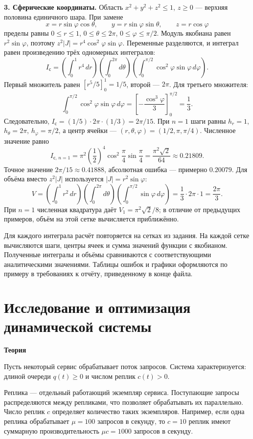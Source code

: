 \documentclass[12pt,a4paper]{article}
\newcommand{\taskhead}[1]{\par\textbf{#1}\par}
\begin{document}
\textbf{3. Сферические координаты.}
Область $x^2+y^2+z^2\leq1$, $z\geq0$ --- верхняя половина единичного шара.
При замене
\[
x=r\sin\varphi\cos\theta,\qquad
 y=r\sin\varphi\sin\theta,\qquad z=r\cos\varphi
\]
пределы равны $0\leq r\leq1$, $0\leq\theta\leq2\pi$,
$0\leq\varphi\leq\pi/2$. Модуль якобиана равен $r^2\sin\varphi$,
поэтому $z^2|J|=r^4\cos^2\varphi\sin\varphi$.
Переменные разделяются, и интеграл равен произведению трёх одномерных интегралов:
\[
I_{\mathrm{с}}=
\left(\int_0^1r^4\,dr\right)
\left(\int_0^{2\pi}d\theta\right)
\left(\int_0^{\pi/2}\cos^2\varphi\sin\varphi\,d\varphi\right).
\]
Первый множитель равен $[r^5/5]_0^1=1/5$, второй --- $2\pi$.
Для третьего множителя:
\[
\int_0^{\pi/2}\cos^2\varphi\sin\varphi\,d\varphi
=\left[-\frac{\cos^3\varphi}{3}\right]_0^{\pi/2}=\frac13.
\]
Следовательно, $I_{\mathrm{с}}=(1/5)\cdot2\pi\cdot(1/3)=2\pi/15$.
При $n=1$ шаги равны $h_r=1$, $h_\theta=2\pi$, $h_\varphi=\pi/2$,
а центр ячейки --- $(r,\theta,\varphi)=(1/2,\pi,\pi/4)$.
Численное значение равно
\[
I_{\mathrm{с},\,n=1}
=\pi^2\left(\frac12\right)^4
\cos^2\frac\pi4\sin\frac\pi4
=\frac{\pi^2\sqrt2}{64}\approx0.21809.
\]
Точное значение $2\pi/15\approx0.41888$, абсолютная ошибка --- примерно $0.20079$.
Для объёма вместо $z^2|J|$ используется $|J|=r^2\sin\varphi$:
\[
V=\left(\int_0^1r^2\,dr\right)
\left(\int_0^{2\pi}d\theta\right)
\left(\int_0^{\pi/2}\sin\varphi\,d\varphi\right)
=\frac13\cdot2\pi\cdot1=\frac{2\pi}{3}.
\]
При $n=1$ численная квадратура даёт $V_1=\pi^2\sqrt2/8$;
в отличие от предыдущих примеров, объём на этой сетке вычисляется приближённо.

Для каждого интеграла расчёт повторяется на сетках из задания.
На каждой сетке вычисляются шаги, центры ячеек и сумма значений функции
с якобианом. Полученные интегралы и объёмы сравниваются с соответствующими
аналитическими значениями. Таблицы ошибок и графики оформляются по примеру
в требованиях к отчёту, приведенному в конце файла.

\newpage

\section{Исследование и оптимизация динамической системы}
\taskhead{Теория}
Пусть некоторый сервис обрабатывает поток запросов. Система характеризуется: длиной очереди
$q(t)\geq0$ и числом реплик $c(t)>0$.

Реплика --- отдельный работающий экземпляр сервиса. Поступающие запросы
распределяются между репликами, что позволяет обрабатывать их параллельно.
Число реплик $c$ определяет количество таких экземпляров. Например,
если одна реплика обрабатывает $\mu=100$ запросов в секунду, то $c=10$
реплик имеют суммарную производительность $\mu c=1000$ запросов в секунду.
\end{document}
